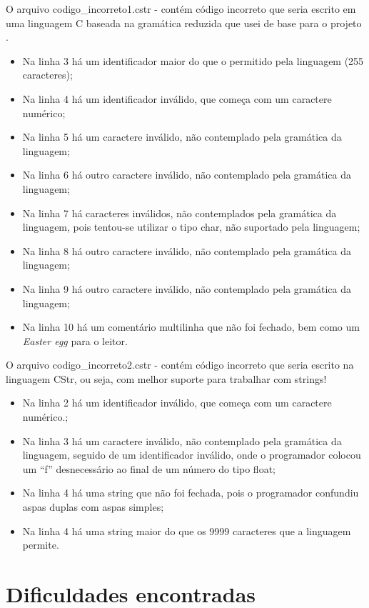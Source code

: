 \documentclass[12pt]{article}
\begin{document}
O arquivo codigo\_incorreto1.cstr - contém código incorreto que seria escrito em uma linguagem C baseada na gramática reduzida que usei de base para o projeto \cite{minic}.
\begin{itemize}
	\item Na linha 3 há um identificador maior do que o permitido pela linguagem (255 caracteres);
	\item Na linha 4 há um identificador inválido, que começa com um caractere numérico;
	\item Na linha 5 há um caractere inválido, não contemplado pela gramática da linguagem;
	\item Na linha 6 há outro caractere inválido, não contemplado pela gramática da linguagem;
	\item Na linha 7 há caracteres inválidos, não contemplados pela gramática da linguagem, pois tentou-se utilizar o tipo char, não suportado pela linguagem;
	\item Na linha 8 há outro caractere inválido, não contemplado pela gramática da linguagem;
	\item Na linha 9 há outro caractere inválido, não contemplado pela gramática da linguagem;
	\item Na linha 10 há um comentário multilinha que não foi fechado, bem como um \textit{Easter egg} para o leitor.
\end{itemize}
	

O arquivo codigo\_incorreto2.cstr - contém código incorreto que seria escrito na linguagem CStr, ou seja, com melhor suporte para trabalhar com strings!\\
\begin{itemize}
	\item Na linha 2 há um identificador inválido, que começa com um caractere numérico.;
	\item Na linha 3 há um caractere inválido, não contemplado pela gramática da linguagem, seguido de um identificador inválido, onde o programador colocou um ``f'' desnecessário ao final de um número do tipo float;
	\item Na linha 4 há uma string que não foi fechada, pois o programador confundiu aspas duplas com aspas simples;
	\item Na linha 4 há uma string maior do que os 9999 caracteres que a linguagem permite.\\
\end{itemize}

\section{Dificuldades encontradas}
\end{document}
